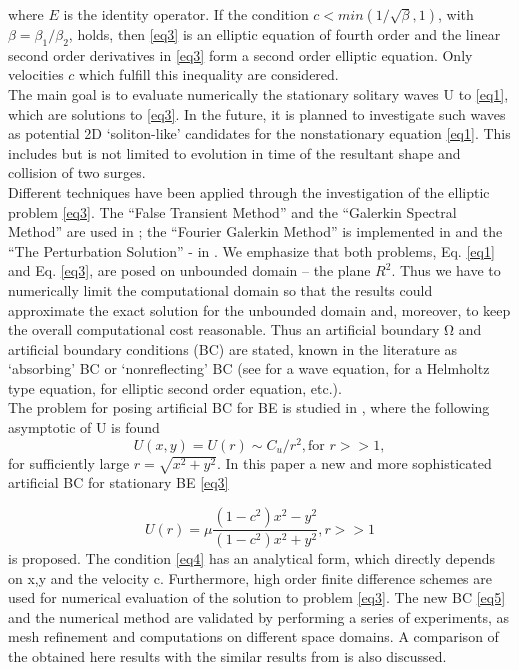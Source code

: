 \documentclass[12pt]{article}
\theoremstyle{theorem}
\theoremstyle{defi}
\begin{document}
where $E$ is the identity operator. If the condition  $c<min(1/\sqrt{\beta}, 1)$, with $\beta = \beta_1/\beta_2$,   holds, then \eqref{eq3} is an elliptic equation of fourth order and the linear second order derivatives in \eqref{eq3} form a second order elliptic equation. Only velocities $c$ which fulfill this inequality are considered.
\\
 The main goal is to evaluate numerically the stationary solitary waves U to \eqref{eq1}, which are solutions to \eqref{eq3}. In the future, it is planned to investigate such waves as potential 2D  ‘soliton-like’ candidates for the nonstationary equation \eqref{eq1}. This includes but is not limited to evolution in time of the resultant shape and collision of two surges.
\\
Different techniques have been applied through the investigation of the elliptic problem \eqref{eq3}. The “False Transient Method” and the “Galerkin Spectral Method” are used in \cite{ref6,ref9} ; the “Fourier Galerkin Method” is implemented in \cite{ref8,ref9} and the “The Perturbation Solution” - in \cite{ref10}.
We emphasize that both problems, Eq. \eqref{eq1} and Eq. \eqref{eq3}, are posed on unbounded domain – the plane $R^2$. Thus we have to numerically limit the computational domain so that the results could approximate the exact solution for the unbounded domain and, moreover, to keep the overall computational cost reasonable.
Thus an artificial boundary $Ω$ and artificial boundary conditions (BC) are stated, known in the literature as ‘absorbing’ BC or ‘nonreflecting’ BC (see \cite{ref11} for a wave equation, \cite{ref12} for a Helmholtz type equation, \cite{ref13} for elliptic second order equation, etc.). 
\\
The problem for posing artificial BC for BE is studied in \cite{ref6}, where the following asymptotic of U is found
\begin{equation}
U(x,y) = U(r) \sim  C_u/r^2, \text{for } r >> 1, \label{eq4}
\end{equation}
for sufficiently large $r=\sqrt{x^2 + y^2}$.
In this paper a new and more sophisticated artificial BC for stationary BE \eqref{eq3}

\begin{equation}
U(r) =  \mu \frac{(1-c^2)x^2 - y^2}{(1-c^2)x^2 + y^2}, r >> 1  \label{eq5}
\end{equation}
is proposed. The condition \eqref{eq4}  has an analytical form, which directly depends on x,y and the velocity c. Furthermore, high order finite difference schemes are used for numerical evaluation of the solution to problem \eqref{eq3}. The new BC \eqref{eq5} and the numerical method are validated by performing a series of experiments, as mesh refinement and computations on different space domains. A comparison of the obtained here results with the similar results from  \cite{ref10} is also discussed. 
\end{document}
